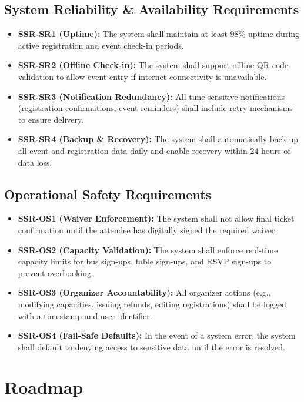 \documentclass{article}
\begin{document}
\subsection{System Reliability \& Availability Requirements}
\begin{itemize}
    \item \textbf{SSR-SR1 (Uptime):} The system shall maintain at least 98\% uptime during active registration and event check-in periods.
    \item \textbf{SSR-SR2 (Offline Check-in):} The system shall support offline QR code validation to allow event entry if internet connectivity is unavailable.
    \item \textbf{SSR-SR3 (Notification Redundancy):} All time-sensitive notifications (registration confirmations, event reminders) shall include retry mechanisms to ensure delivery.
    \item \textbf{SSR-SR4 (Backup \& Recovery):} The system shall automatically back up all event and registration data daily and enable recovery within 24 hours of data loss.
\end{itemize}

\subsection{Operational Safety Requirements}
\begin{itemize}
    \item \textbf{SSR-OS1 (Waiver Enforcement):} The system shall not allow final ticket confirmation until the attendee has digitally signed the required waiver.
    \item \textbf{SSR-OS2 (Capacity Validation):} The system shall enforce real-time capacity limits for bus sign-ups, table sign-ups, and RSVP sign-ups to prevent overbooking.
    \item \textbf{SSR-OS3 (Organizer Accountability):} All organizer actions (e.g., modifying capacities, issuing refunds, editing registrations) shall be logged with a timestamp and user identifier.
    \item \textbf{SSR-OS4 (Fail-Safe Defaults):} In the event of a system error, the system shall default to denying access to sensitive data until the error is resolved.
\end{itemize}


\section{Roadmap}
\end{document}
